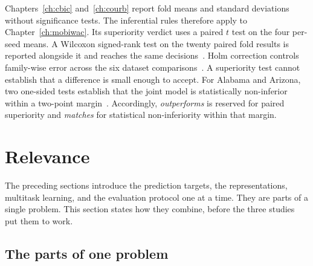 Chapters~\ref{ch:cbic} and~\ref{ch:courb} report fold means and standard deviations
without significance tests. The inferential rules therefore apply to
Chapter~\ref{ch:mobiwac}. Its superiority verdict uses a paired $t$ test on the four
per-seed means. A Wilcoxon signed-rank test on the twenty paired fold results is
reported alongside it and reaches the same decisions~\cite{wilcoxon1945}. Holm
correction controls family-wise error across the six dataset
comparisons~\cite{holm1979}. A superiority test cannot establish that a difference is
small enough to accept. For Alabama and Arizona, two one-sided tests establish that
the joint model is statistically non-inferior within a two-point
margin~\cite{lakens2017tost}. Accordingly, \emph{outperforms} is reserved for paired
superiority and \emph{matches} for statistical non-inferiority within that margin.


\section{Relevance}
\label{sec:fund:relevance}

The preceding sections introduce the prediction targets, the representations, multitask
learning, and the evaluation protocol one at a time. They are parts of a
single problem. This section states how they combine, before the three studies put
them to work.

\subsection{The parts of one problem}

